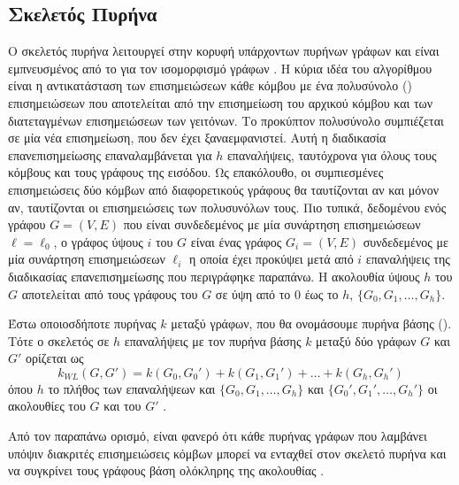 \subsection{Σκελετός Πυρήνα }
\label{ssec:wl}
Ο σκελετός πυρήνα  λειτουργεί στην κορυφή υπάρχοντων πυρήνων γράφων και είναι εμπνευσμένος από το  για τον ισομορφισμό γράφων \cite{weisfeiler1968reduction}.
Η κύρια ιδέα του αλγορίθμου  είναι η αντικατάσταση των επισημειώσεων κάθε κόμβου με ένα πολυσύνολο () επισημειώσεων που αποτελείται από την επισημείωση του αρχικού κόμβου και των διατεταγμένων επισημειώσεων των γειτόνων.
Το προκύπτον πολυσύνολο συμπιέζεται σε μία νέα επισημείωση, που δεν έχει ξαναεμφανιστεί.
Αυτή η διαδικασία επανεπισημείωσης επαναλαμβάνεται για $h$ επαναλήψεις, ταυτόχρονα για όλους τους κόμβους και τους γράφους της εισόδου.
Ως επακόλουθο, οι συμπιεσμένες επισημειώσεις δύο κόμβων από διαφορετικούς γράφους θα ταυτίζονται αν και μόνον αν, ταυτίζονται οι επισημειώσεις των πολυσυνόλων τους.
Πιο τυπικά, δεδομένου ενός γράφου $G=(V,E)$ που είναι συνδεδεμένος με μία συνάρτηση επισημειώσεων $\ell=\ell_0$, ο γράφος ύψους $i$  του $G$ είναι ένας γράφος $G_i=(V,E)$ συνδεδεμένος με μία συνάρτηση επισημειώσεων $\ell_i$ η οποία έχει προκύψει μετά από $i$ επαναλήψεις της διαδικασίας επανεπισημείωσης που περιγράφηκε παραπάνω.
Η ακολουθία  ύψους $h$ του $G$ αποτελείται από τους γράφους  του $G$ σε ύψη από το $0$ έως το $h$, $\{ G_0,G_1,\ldots,G_h\}$. 
\begin{definition}
	Έστω οποιοσδήποτε πυρήνας $k$ μεταξύ γράφων, που θα ονομάσουμε πυρήνα βάσης ().
	Τότε ο σκελετός  σε $h$ επαναλήψεις με τον πυρήνα βάσης $k$ μεταξύ δύο γράφων $G$ και $G'$ ορίζεται ως
	\begin{equation}
		k_{WL}(G,G') = k(G_0,G_0') + k(G_1,G_1') + \ldots + k(G_h,G_h')
	\end{equation}
	όπου $h$ το πλήθος των επαναλήψεων  και $\{ G_0,G_1,\ldots,G_h\}$ και $\{ G_0',G_1',\ldots,G_h'\}$ οι ακολουθίες  του $G$ και του $G'$ .
\end{definition}
Από τον παραπάνω ορισμό, είναι φανερό ότι κάθε πυρήνας γράφων που λαμβάνει υπόψιν διακριτές επισημειώσεις κόμβων μπορεί να ενταχθεί στον σκελετό πυρήνα  και να συγκρίνει τους γράφους βάση ολόκληρης της ακολουθίας .\par

